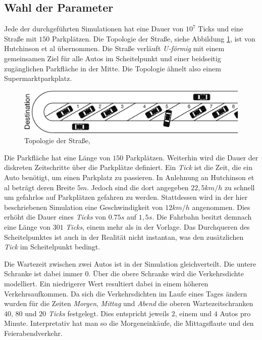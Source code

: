 \subsection{Wahl der Parameter}
Jede der durchgeführten Simulationen hat eine Dauer von $10^7$ Ticks und eine Straße mit $150$ Parkplätzen. Die Topologie der Straße, siehe Abbildung \ref{fig_street}, ist von Hutchinson et al übernommen. Die Straße verläuft \emph{U-förmig} mit einem gemeinsamen Ziel für alle Autos im Scheitelpunkt und einer beidseitig zugänglichen Parkfläche in der Mitte. Die Topologie ähnelt also einem Supermarktparkplatz. 
\begin{figure}
\includegraphics[width=\textwidth]{pics/street.png}
\caption{Topologie der Straße, \cite[Fig. 18-1]{hutchinson}}\label{fig_street}
\end{figure}
 Die Parkfläche hat eine Länge von $150$ Parkplätzen. Weiterhin wird die Dauer der diskreten Zeitschritte über die Parkplätze definiert. Ein \emph{Tick} ist die Zeit, die ein Auto benötigt, um einen Parkplatz zu passieren. 
In Anlehnung an Hutchinson et al \cite[Modeling the Interactions of Parking Strategies, S. 4f]{hutchinson} beträgt deren Breite $5m$. Jedoch sind die dort angegeben $22,5 km/h$ zu schnell um gefahrlos auf Parkplätzen gefahren zu werden. Stattdessen wird in der hier beschriebenen Simulation eine Geschwindigkeit von $12km/h$ angenommen. Dies erhöht die Dauer eines \emph{Ticks} von $0.75s$ auf $1,5s$. Die Fahrbahn besitzt demnach eine Länge von $301$ \emph{Ticks}, einem mehr als in der Vorlage. Das Durchqueren des Scheitelpunktes ist auch in der Realität nicht instantan, was den zusätzlichen \emph{Tick} im Scheitelpunkt bedingt. 

Die Wartezeit zwischen zwei Autos ist in der Simulation gleichverteilt. Die untere Schranke ist dabei immer $0$. Über die obere Schranke wird die Verkehrsdichte modelliert. Ein niedrigerer Wert resultiert dabei in einem höheren Verkehrsaufkommen. Da sich die Verkehrsdichten im Laufe eines Tages ändern wurden für die Zeiten \emph{Morgen}, \emph{Mittag} und \emph{Abend} die oberen Wartezeitschranken $40$, $80$ und $20$ \emph{Ticks} festgelegt. Dies entspricht jeweils $2$, einem und $4$ Autos pro Minute. Interpretativ hat man so die Morgeneinkäufe, die Mittagsflaute und den Feierabendverkehr. 

